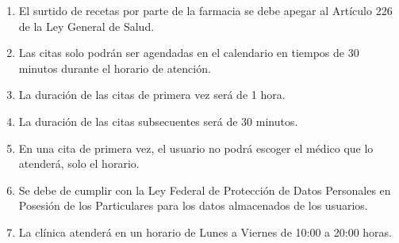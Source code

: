 \documentclass[12pt,letterpaper]{article}
\begin{document}
{{{\begin{itemize}
\begin{enumerate}
                        \item El surtido de recetas por parte de la farmacia se debe apegar al Artículo 226 de la Ley General de Salud.
                        \item Las citas solo podrán ser agendadas en el calendario en tiempos de 30 minutos durante el horario de atención.
                        \item La duración de las citas de primera vez será de 1 hora.
                        \item La duración de las citas  subsecuentes será de 30 minutos.
                        \item En una cita de primera vez, el usuario no podrá escoger el médico que lo atenderá, solo el horario.
                        \item Se debe de cumplir con la Ley Federal de Protección de Datos Personales en Posesión de los Particulares para los datos almacenados de los usuarios.
                        \item La clínica atenderá en un horario de Lunes a Viernes de 10:00 a 20:00 horas.
                    \end{enumerate}
            \end{itemize}
			}
		}
	}
\end{document}
